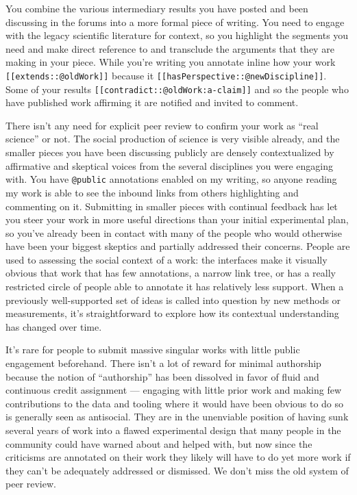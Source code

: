 You combine the various intermediary results you have posted and been
discussing in the forums into a more formal piece of writing. You need
to engage with the legacy scientific literature for context, so you
highlight the segments you need and make direct reference to and
transclude the arguments that they are making in your piece. While
you're writing you annotate inline how your work
\texttt{{[}{[}extends::@oldWork{]}{]}} because it
\texttt{{[}{[}hasPerspective::@newDiscipline{]}{]}}. Some of your
results \texttt{{[}{[}contradict::@oldWork:a-claim{]}{]}} and so the
people who have published work affirming it are notified and invited to
comment.

There isn't any need for explicit peer review to confirm your work as
``real science'' or not. The social production of science is very
visible already, and the smaller pieces you have been discussing
publicly are densely contextualized by affirmative and skeptical voices
from the several disciplines you were engaging with. You have
\texttt{@public} annotations enabled on my writing, so anyone reading my
work is able to see the inbound links from others highlighting and
commenting on it. Submitting in smaller pieces with continual feedback
has let you steer your work in more useful directions than your initial
experimental plan, so you've already been in contact with many of the
people who would otherwise have been your biggest skeptics and partially
addressed their concerns. People are used to assessing the social
context of a work: the interfaces make it visually obvious that work
that has few annotations, a narrow link tree, or has a really restricted
circle of people able to annotate it has relatively less support. When a
previously well-supported set of ideas is called into question by new
methods or measurements, it's straightforward to explore how its
contextual understanding has changed over time.

It's rare for people to submit massive singular works with little public
engagement beforehand. There isn't a lot of reward for minimal
authorship because the notion of ``authorship'' has been dissolved in
favor of fluid and continuous credit assignment --- engaging with little
prior work and making few contributions to the data and tooling where it
would have been obvious to do so is generally seen as antisocial. They
are in the unenviable position of having sunk several years of work into
a flawed experimental design that many people in the community could
have warned about and helped with, but now since the criticisms are
annotated on their work they likely will have to do yet more work if
they can't be adequately addressed or dismissed. We don't miss the old
system of peer review.

